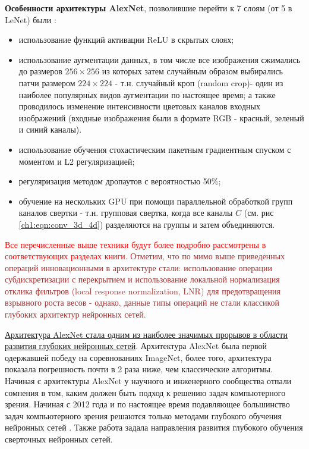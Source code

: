 \documentclass[12pt]{article}
\begin{document}
\begin{sloppypar}
\textbf{Особенности архитектуры AlexNet}, позволившие перейти к 7 слоям (от 5 в LeNet) были \cite{krizhevsky2012imagenet}:
\begin{itemize}
    \item использование функций активации ReLU в скрытых слоях;
    \item использование аугментации данных, в том числе все изображения сжимались до размеров $256\times 256$ из которых затем случайным образом выбирались патчи размером $224\times 224$ - т.н. случайный кроп (random crop)- один из наиболее популярных видов аугментации по настоящее время; а также проводилось изменение интенсивности цветовых каналов входных изображений (входные изображения были в формате RGB - красный, зеленый и синий каналы). 
    \item использование обучения стохастическим пакетным градиентным спуском с моментом и L2 регуляризацией;
    \item регуляризация методом дропаутов с вероятностью 50\%;
    \item обучение на нескольких GPU при помощи параллельной обработкой групп каналов свертки - т.н. групповая свертка, когда все каналы $C$ (см. рис \ref{ch1:eqn:conv_3d_4d}) разделяются на группы и затем объединяются.
\end{itemize}
\textcolor{red}{Все перечисленные выше техники будут более подробно рассмотрены в соответствующих разделах книги.}\textcolor{brown}{
Отметим, что по мимо выше приведенных операций инновационными в архитектуре стали: использование операции субдискретизации с перекрытием и использование локальной нормализация отклика фильтров (local response normalization, LNR) для предотвращения взрывного роста весов \cite{krizhevsky2012imagenet} - однако, данные типы операций не стали классикой глубоких архитектур нейронных сетей.}

\uline{Архитектура AlexNet стала одним из наиболее значимых прорывов в области развития глубоких нейронных сетей}. Архитектура AlexNet была первой  одержавшей победу на соревнованиях ImageNet, более того, архитектура показала погрешность почти в 2 раза ниже, чем классические алгоритмы. Начиная с архитектуры AlexNet у научного и инженерного сообщества отпали сомнения в том, каким должен быть подход к решению задач компьютерного зрения. Начиная с 2012 года и по настоящее время подавляющее большинство задач компьютерного зрения решаются только методами глубокого обучения нейронных сетей \cite{Tsang2020Summary}. Также работа \cite{krizhevsky2012imagenet} задала направления развития глубокого обучения сверточных нейронных сетей. 


\end{sloppypar}
\end{document}
